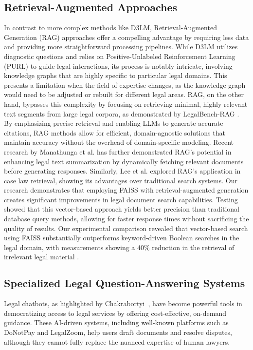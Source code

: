 \subsection{Retrieval-Augmented Approaches}
In contrast to more complex methods like D3LM, Retrieval-Augmented Generation
(RAG) approaches offer a compelling advantage by requiring less data and
providing more straightforward processing pipelines. While D3LM utilizes
diagnostic questions and relies on Positive-Unlabeled Reinforcement Learning
(PURL) to guide legal interactions, its process is notably intricate,
involving knowledge graphs that are highly specific to particular
legal domains. This presents a limitation when the field of expertise changes,
as the knowledge graph would need to be adjusted or rebuilt for different legal
areas.
RAG, on the other hand, bypasses this complexity by focusing on retrieving
minimal, highly relevant text segments from large legal corpora, as
demonstrated by LegalBench-RAG \cite{pipitone2024legalbenchragbenchmarkretrievalaugmentedgeneration}.
By emphasizing precise retrieval and enabling LLMs to generate accurate
citations, RAG methods allow for efficient, domain-agnostic solutions that
maintain accuracy without the overhead of domain-specific modeling. Recent
research by Manathunga et al. \cite{manathunga2023retrievalaugmentedgenerationrepresentative} has
further demonstrated RAG's potential in enhancing legal text summarization by dynamically
fetching relevant documents before generating responses. Similarly,
Lee et al. \cite{ryu-etal-2023-retrieval} explored RAG's application in case
law retrieval, showing its advantages over traditional search systems.
Our research demonstrates that employing FAISS with retrieval-augmented generation 
creates significant improvements in legal document search capabilities. 
\cite{panchal2025lawpalretrievalaugmented} Testing showed that this vector-based approach 
yields better precision than traditional database query methods, allowing for faster 
response times without sacrificing the quality of results. Our experimental comparison 
revealed that vector-based search using FAISS substantially outperforms keyword-driven 
Boolean searches in the legal domain, with measurements showing a 40\% reduction in the 
retrieval of irrelevant legal material \cite{zeng2023scalableeffectivegenerativeinformation}.

\subsection{Specialized Legal Question-Answering Systems}
Legal chatbots, as highlighted by Chakrabortyi~\cite{chakraborty2023revolutionizing}, 
have become powerful tools in democratizing access to legal services by 
offering cost-effective, on-demand guidance. These AI-driven systems, 
including well-known platforms such as DoNotPay and LegalZoom, 
help users draft documents and resolve disputes, although they cannot 
fully replace the nuanced expertise of human lawyers.


